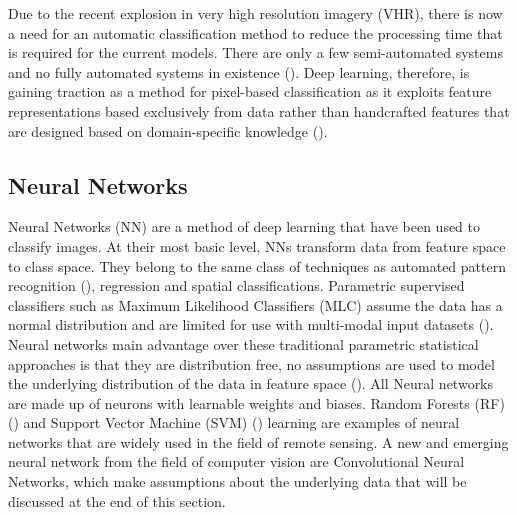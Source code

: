 \par
Due to the recent explosion in very high resolution imagery (VHR), there is now a need for an automatic classification method to reduce the processing time that is required for the current models. There are only a few semi-automated systems and no fully automated systems in existence (\cite{baltsavias04,mayer08,mnih13}). Deep learning, therefore, is gaining traction as a method for pixel-based classification as it exploits feature representations based exclusively from data rather than handcrafted features that are designed based on domain-specific knowledge (\cite{xiao17,maggiori17a}). 
\paragraph{}
\subsection*{Neural Networks}
Neural Networks (NN) are a method of deep learning that have been used to classify images. At their most basic level, NNs transform data from feature space to class space. They belong to the same class of techniques as automated pattern recognition (\cite{Ritter89}), regression and spatial classifications. Parametric supervised classifiers such as Maximum Likelihood Classifiers (MLC) assume the data has a normal distribution and are limited for use with multi-modal input datasets (\cite{Liu11}). Neural networks main advantage over these traditional parametric statistical approaches is that they are distribution free, no assumptions are used to model the underlying distribution of the data in feature space (\cite{Patricia97}). All Neural networks are made up of neurons with learnable weights and biases. Random Forests (RF) (\cite{belgiu16,Breiman01}) and Support Vector Machine (SVM) (\cite{cortes95,vapnik82}) learning are examples of neural networks that are widely used in the field of remote sensing. A new and emerging neural network from the field of computer vision are Convolutional Neural Networks, which make assumptions about the underlying data that will be discussed at the end of this section. 

